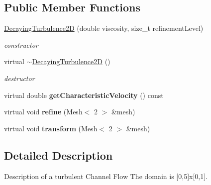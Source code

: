 \subsection*{Public Member Functions}
\begin{DoxyCompactItemize}
\item 
\hyperlink{classnatrium_1_1DecayingTurbulence2D_af1aebee0f89465ec385a1a749f0ceb76}{DecayingTurbulence2D} (double viscosity, size\_\-t refinementLevel)
\begin{DoxyCompactList}\small\item\em constructor \item\end{DoxyCompactList}\item 
\hypertarget{classnatrium_1_1DecayingTurbulence2D_a82284a66335b86b3d82c2dca05ab6a77}{
virtual \hyperlink{classnatrium_1_1DecayingTurbulence2D_a82284a66335b86b3d82c2dca05ab6a77}{$\sim$DecayingTurbulence2D} ()}
\label{classnatrium_1_1DecayingTurbulence2D_a82284a66335b86b3d82c2dca05ab6a77}

\begin{DoxyCompactList}\small\item\em destructor \item\end{DoxyCompactList}\item 
\hypertarget{classnatrium_1_1DecayingTurbulence2D_a55dba4c6ae8523bc144db1bfe3a72951}{
virtual double {\bfseries getCharacteristicVelocity} () const }
\label{classnatrium_1_1DecayingTurbulence2D_a55dba4c6ae8523bc144db1bfe3a72951}

\item 
\hypertarget{classnatrium_1_1DecayingTurbulence2D_a391fe8a9c2ccaf4aaf6fcde4ea9e88f0}{
virtual void {\bfseries refine} (Mesh$<$ 2 $>$ \&mesh)}
\label{classnatrium_1_1DecayingTurbulence2D_a391fe8a9c2ccaf4aaf6fcde4ea9e88f0}

\item 
\hypertarget{classnatrium_1_1DecayingTurbulence2D_a1d5c4e7c4addab6647514ed4e102c181}{
virtual void {\bfseries transform} (Mesh$<$ 2 $>$ \&mesh)}
\label{classnatrium_1_1DecayingTurbulence2D_a1d5c4e7c4addab6647514ed4e102c181}

\end{DoxyCompactItemize}


\subsection{Detailed Description}
Description of a turbulent Channel Flow The domain is \mbox{[}0,5\mbox{]}x\mbox{[}0,1\mbox{]}. 

